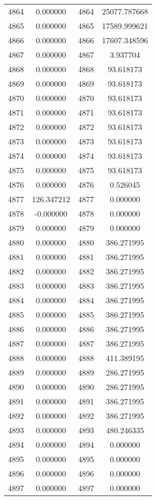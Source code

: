 \documentclass[12pt]{article}
\begin{document}
\begin{longtable}{@{}cccc@{}}
4864 & 0.000000 & 4864 & 25077.787668 \\
4865 & 0.000000 & 4865 & 17589.999621 \\
4866 & 0.000000 & 4866 & 17607.348596 \\
4867 & 0.000000 & 4867 & 3.937704 \\
4868 & 0.000000 & 4868 & 93.618173 \\
4869 & 0.000000 & 4869 & 93.618173 \\
4870 & 0.000000 & 4870 & 93.618173 \\
4871 & 0.000000 & 4871 & 93.618173 \\
4872 & 0.000000 & 4872 & 93.618173 \\
4873 & 0.000000 & 4873 & 93.618173 \\
4874 & 0.000000 & 4874 & 93.618173 \\
4875 & 0.000000 & 4875 & 93.618173 \\
4876 & 0.000000 & 4876 & 0.526045 \\
4877 & 126.347212 & 4877 & 0.000000 \\
4878 & -0.000000 & 4878 & 0.000000 \\
4879 & 0.000000 & 4879 & 0.000000 \\
4880 & 0.000000 & 4880 & 386.271995 \\
4881 & 0.000000 & 4881 & 386.271995 \\
4882 & 0.000000 & 4882 & 386.271995 \\
4883 & 0.000000 & 4883 & 386.271995 \\
4884 & 0.000000 & 4884 & 386.271995 \\
4885 & 0.000000 & 4885 & 386.271995 \\
4886 & 0.000000 & 4886 & 386.271995 \\
4887 & 0.000000 & 4887 & 386.271995 \\
4888 & 0.000000 & 4888 & 411.389195 \\
4889 & 0.000000 & 4889 & 286.271995 \\
4890 & 0.000000 & 4890 & 286.271995 \\
4891 & 0.000000 & 4891 & 386.271995 \\
4892 & 0.000000 & 4892 & 386.271995 \\
4893 & 0.000000 & 4893 & 480.246335 \\
4894 & 0.000000 & 4894 & 0.000000 \\
4895 & 0.000000 & 4895 & 0.000000 \\
4896 & 0.000000 & 4896 & 0.000000 \\
4897 & 0.000000 & 4897 & 0.000000 \\

\end{longtable}
\end{document}
